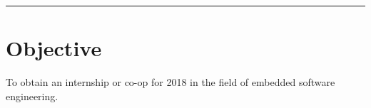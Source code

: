 \documentclass[resmargin]{res}
\begin{document}

\address{505 Peace St.\\Pella, IA 50219}
\address{816-785-4105\\stewythe1st@gmail.com}

\begin{resume}

\hspace{-1.26in}\noindent\rule{7.0in}{0.4pt}

\section{Objective}
To obtain an internship or co-op for 2018 in the field of embedded software engineering.


\end{resume}
\end{document}
